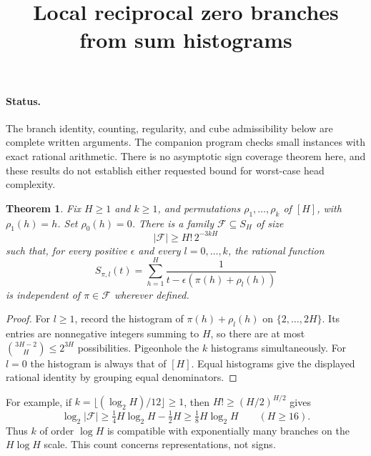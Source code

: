\documentclass[11pt]{article}
\title{Local reciprocal zero branches from sum histograms}
\author{}\date{}
\newtheorem{theorem}{Theorem}
\begin{document}
\maketitle
\paragraph{Status.}
The branch identity, counting, regularity, and cube admissibility below
are complete written arguments. The companion program checks small
instances with exact rational arithmetic. There is no asymptotic sign
coverage theorem here, and these results do not establish either requested
bound for worst-case head complexity.

\begin{theorem}
Fix $H\geq1$ and $k\geq1$, and permutations $\rho_1,\ldots,\rho_k$
of $[H]$, with $\rho_1(h)=h$. Set $\rho_0(h)=0$. There is a family
$\mathcal F\subseteq S_H$ of size
\[
 |\mathcal F|\geq H!\,2^{-3kH}
\]
such that, for every positive $\epsilon$ and every $l=0,\ldots,k$,
the rational function
\[
 S_{\pi,l}(t)=\sum_{h=1}^H
       \frac1{t-\epsilon(\pi(h)+\rho_l(h))}
\]
is independent of $\pi\in\mathcal F$ wherever defined.
\end{theorem}
\begin{proof}
For $l\geq1$, record the histogram of $\pi(h)+\rho_l(h)$ on
$\{2,\ldots,2H\}$. Its entries are nonnegative integers summing to
$H$, so there are at most $\binom{3H-2}{H}\leq2^{3H}$ possibilities.
Pigeonhole the $k$ histograms simultaneously. For $l=0$ the histogram
is always that of $[H]$. Equal histograms give the displayed rational
identity by grouping equal denominators.
\end{proof}

For example, if $k=\lfloor(\log_2H)/12\rfloor\geq1$, then
$H!\geq(H/2)^{H/2}$ gives
\[
 \log_2|\mathcal F|
 \geq \tfrac14H\log_2H-\tfrac12H
 \geq\tfrac18H\log_2H \qquad(H\geq16).
\]
Thus $k$ of order $\log H$ is compatible with exponentially many
branches on the $H\log H$ scale. This count concerns representations,
not signs.
\end{document}
